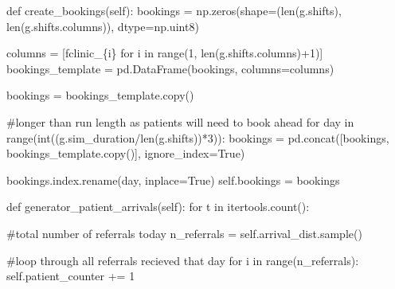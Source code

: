 \documentclass[
  letterpaper,
  DIV=11,
  numbers=noendperiod]{scrreprt}
\newenvironment{Shaded}{\begin{snugshade}}{\end{snugshade}}
\newcommand{\BuiltInTok}[1]{\textcolor[rgb]{0.00,0.23,0.31}{#1}}
\newcommand{\CommentTok}[1]{\textcolor[rgb]{0.37,0.37,0.37}{#1}}
\newcommand{\ControlFlowTok}[1]{\textcolor[rgb]{0.00,0.23,0.31}{#1}}
\newcommand{\DecValTok}[1]{\textcolor[rgb]{0.68,0.00,0.00}{#1}}
\newcommand{\KeywordTok}[1]{\textcolor[rgb]{0.00,0.23,0.31}{#1}}
\newcommand{\NormalTok}[1]{\textcolor[rgb]{0.00,0.23,0.31}{#1}}
\newcommand{\OperatorTok}[1]{\textcolor[rgb]{0.37,0.37,0.37}{#1}}
\newcommand{\SpecialCharTok}[1]{\textcolor[rgb]{0.37,0.37,0.37}{#1}}
\newcommand{\SpecialStringTok}[1]{\textcolor[rgb]{0.13,0.47,0.30}{#1}}
\newcommand{\StringTok}[1]{\textcolor[rgb]{0.13,0.47,0.30}{#1}}
\newcommand{\VariableTok}[1]{\textcolor[rgb]{0.07,0.07,0.07}{#1}}
\begin{document}
\begin{tcolorbox}
\begin{Shaded}
\begin{Highlighting}[]
    \KeywordTok{def}\NormalTok{ create\_bookings(}\VariableTok{self}\NormalTok{):}
\NormalTok{        bookings }\OperatorTok{=}\NormalTok{ np.zeros(shape}\OperatorTok{=}\NormalTok{(}\BuiltInTok{len}\NormalTok{(g.shifts), }\BuiltInTok{len}\NormalTok{(g.shifts.columns)), dtype}\OperatorTok{=}\NormalTok{np.uint8)}

\NormalTok{        columns }\OperatorTok{=}\NormalTok{ [}\SpecialStringTok{f\textquotesingle{}clinic\_}\SpecialCharTok{\{}\NormalTok{i}\SpecialCharTok{\}}\SpecialStringTok{\textquotesingle{}} \ControlFlowTok{for}\NormalTok{ i }\KeywordTok{in} \BuiltInTok{range}\NormalTok{(}\DecValTok{1}\NormalTok{, }\BuiltInTok{len}\NormalTok{(g.shifts.columns)}\OperatorTok{+}\DecValTok{1}\NormalTok{)]}
\NormalTok{        bookings\_template }\OperatorTok{=}\NormalTok{ pd.DataFrame(bookings, columns}\OperatorTok{=}\NormalTok{columns)}

\NormalTok{        bookings }\OperatorTok{=}\NormalTok{ bookings\_template.copy()}

        \CommentTok{\#longer than run length as patients will need to book ahead}
        \ControlFlowTok{for}\NormalTok{ day }\KeywordTok{in} \BuiltInTok{range}\NormalTok{(}\BuiltInTok{int}\NormalTok{((g.sim\_duration}\OperatorTok{/}\BuiltInTok{len}\NormalTok{(g.shifts))}\OperatorTok{*}\DecValTok{3}\NormalTok{)):}
\NormalTok{            bookings }\OperatorTok{=}\NormalTok{ pd.concat([bookings, bookings\_template.copy()],}
\NormalTok{                                 ignore\_index}\OperatorTok{=}\VariableTok{True}\NormalTok{)}

\NormalTok{        bookings.index.rename(}\StringTok{\textquotesingle{}day\textquotesingle{}}\NormalTok{, inplace}\OperatorTok{=}\VariableTok{True}\NormalTok{)}
        \VariableTok{self}\NormalTok{.bookings }\OperatorTok{=}\NormalTok{ bookings}

    \KeywordTok{def}\NormalTok{ generator\_patient\_arrivals(}\VariableTok{self}\NormalTok{):}
        \ControlFlowTok{for}\NormalTok{ t }\KeywordTok{in}\NormalTok{ itertools.count():}

            \CommentTok{\#total number of referrals today}
\NormalTok{            n\_referrals }\OperatorTok{=} \VariableTok{self}\NormalTok{.arrival\_dist.sample()}

            \CommentTok{\#loop through all referrals recieved that day}
            \ControlFlowTok{for}\NormalTok{ i }\KeywordTok{in} \BuiltInTok{range}\NormalTok{(n\_referrals):}
                \VariableTok{self}\NormalTok{.patient\_counter }\OperatorTok{+=} \DecValTok{1}


\end{Highlighting}
\end{Shaded}
\end{tcolorbox}
\end{document}

